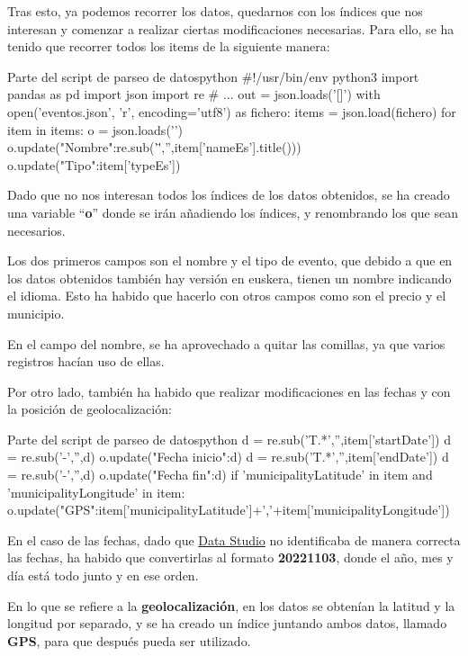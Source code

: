 \documentclass{\ClassPath/viu-tfm-template}
\begin{document}
Tras esto, ya podemos recorrer los datos, quedarnos con los índices que nos interesan y comenzar a realizar ciertas modificaciones necesarias. Para ello, se ha tenido que recorrer todos los items de la siguiente manera:

\begin{mycode}{Parte del script de parseo de datos}{python}{}
#!/usr/bin/env python3
import pandas as pd
import json
import re
# ...
out = json.loads('[]')
with open('eventos.json', 'r', encoding='utf8') as fichero:
   items = json.load(fichero)
   for item in items:
      o = json.loads('{}')
      o.update({"Nombre":re.sub('\"','',item['nameEs'].title())})
      o.update({"Tipo":item['typeEs']})
\end{mycode}

Dado que no nos interesan todos los índices de los datos obtenidos, se ha creado una variable “\textbf{o}” donde se irán añadiendo los índices, y renombrando los que sean necesarios.

Los dos primeros campos son el nombre y el tipo de evento, que debido a que en los datos obtenidos también hay versión en euskera, tienen un nombre indicando el idioma. Esto ha habido que hacerlo con otros campos como son el precio y el municipio.

En el campo del nombre, se ha aprovechado a quitar las comillas, ya que varios registros hacían uso de ellas.

Por otro lado, también ha habido que realizar modificaciones en las fechas y con la posición de geolocalización:


\begin{mycode}{Parte del script de parseo de datos}{python}{{\footnotesize }}
d = re.sub('T.*','',item['startDate'])
d = re.sub('-','',d)
o.update({"Fecha inicio":d})
d = re.sub('T.*','',item['endDate'])
d = re.sub('-','',d)
o.update({"Fecha fin":d})
if 'municipalityLatitude' in item and 'municipalityLongitude' in item:
    o.update({"GPS":item['municipalityLatitude']+','+item['municipalityLongitude']})
\end{mycode}

En el caso de las fechas, dado que \href{https://datastudio.google.com/}{Data Studio} no identificaba de manera correcta las fechas, ha habido que convertirlas al formato \textbf{20221103}, donde el año, mes y día está todo junto y en ese orden.

En lo que se refiere a la \textbf{geolocalización}, en los datos se obtenían la latitud y la longitud por separado, y se ha creado un índice juntando ambos datos, llamado \textbf{GPS}, para que después pueda ser utilizado.
\end{document}
